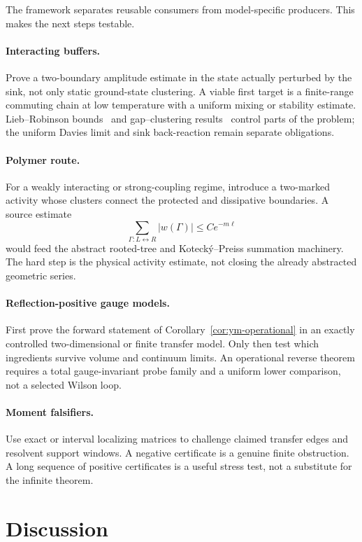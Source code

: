 \documentclass[11pt,a4paper]{article}
\theoremstyle{definition}
\theoremstyle{remark}
\begin{document}
The framework separates reusable consumers from model-specific producers.
This makes the next steps testable.

\paragraph{Interacting buffers.}
Prove a two-boundary amplitude estimate in the state actually perturbed by the
sink, not only static ground-state clustering.  A viable first target is a
finite-range commuting chain at low temperature with a uniform mixing or
stability estimate.  Lieb--Robinson bounds~\cite{LiebRobinson,Poulin2010} and
gap--clustering results~\cite{HastingsKoma} control parts of the problem; the
uniform Davies limit and sink back-reaction remain separate obligations.

\paragraph{Polymer route.}
For a weakly interacting or strong-coupling regime, introduce a two-marked
activity whose clusters connect the protected and dissipative boundaries.  A
source estimate
\[
  \sum_{\Gamma:L\leftrightarrow R}|w(\Gamma)|
  \leq C e^{-m\ell}
\]
would feed the abstract rooted-tree and Koteck\'y--Preiss summation machinery.
The hard step is the physical activity estimate, not closing the already
abstracted geometric series.

\paragraph{Reflection-positive gauge models.}
First prove the forward statement of Corollary~\ref{cor:ym-operational} in an
exactly controlled two-dimensional or finite transfer model.  Only then test
which ingredients survive volume and continuum limits.  An operational
reverse theorem requires a total gauge-invariant probe family and a uniform
lower comparison, not a selected Wilson loop.

\paragraph{Moment falsifiers.}
Use exact or interval localizing matrices to challenge claimed transfer edges
and resolvent support windows.  A negative certificate is a genuine finite
obstruction.  A long sequence of positive certificates is a useful stress
test, not a substitute for the infinite theorem.

\section{Discussion}
\end{document}
